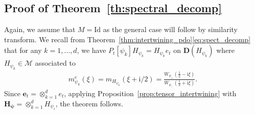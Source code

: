 \documentclass[12pt]{amsart}
\newcommand{\hlabel}{\phantomsection\label}
\numberwithin{equation}{section}
\newcommand{\bb}{\mathbb}
\newcommand{\Hpsi}{H_\psi}
\newcommand{\D}{\mathbf{D}}
\renewcommand{\i}{\mathrm{i}}
\theoremstyle{definition}
\theoremstyle{assump}
\theoremstyle{remark}
\begin{document}
{%


%



\subsection{Proof of Theorem~\ref{th:spectral_decomp}}\hlabel{sec:proof_th:spectral_decomp} Again, we assume that $M=\mathrm{Id}$ as the general case will follow by similarity transform. We recall from  Theorem~\ref{thm:intertwining_pdo}\eqref{eq:spect_decomp} that for any $k=1,\ldots, d$, we have $P_t[\psi_k]H_{\psi_k}=H_{\psi_k} e_t$ on $\D(H_{\psi_k})$ where $H_{\psi_k}\in\mathscr{M}$ associated to
\begin{align*}
	m^e_{\psi_k}(\xi)=m_{H_{\psi_k}}(\xi+\i/2)=\frac{W_{\phi_+}(\frac{1}{2}-\i\xi)}{W_{\phi_-}(\frac{1}{2}+\i\xi)}.
\end{align*}
Since $\bm{e}_t=\otimes_{k=1}^d e_t$, applying Proposition~\ref{prop:tensor_intertwining} with $\bm{\Hpsi}=\otimes_{k=1}^dH_{\psi_i}$, the theorem follows.

}
\end{document}
